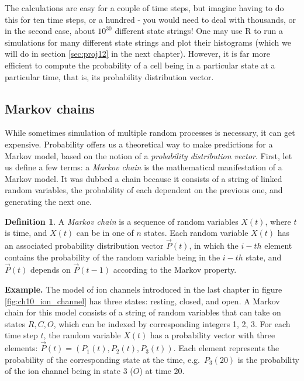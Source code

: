 \documentclass[
]{book}
\theoremstyle{definition}
\newtheorem{definition}{Definition}[chapter]
\theoremstyle{definition}
\theoremstyle{definition}
\theoremstyle{remark}
\begin{document}
The calculations are easy for a couple of time steps, but imagine having to do this for ten time steps, or a hundred - you would need to deal with thousands, or in the second case, about \(10^{30}\) different state strings! One may use R to run a simulations for many different state strings and plot their histograms (which we will do in section \ref{sec:proj12} in the next chapter). However, it is far more efficient to compute the probability of a cell being in a particular state at a particular time, that is, its probability distribution vector.

\hypertarget{markov-chains}{%
\subsection{Markov chains}\label{markov-chains}}

While sometimes simulation of multiple random processes is necessary, it can get expensive. Probability offers us a theoretical way to make predictions for a Markov model, based on the notion of a \emph{probability distribution vector}. First, let us define a few terms: a \emph{Markov chain} is the mathematical manifestation of a Markov model. It was dubbed a chain because it consists of a string of linked random variables, the probability of each dependent on the previous one, and generating the next one.

\begin{definition}
\protect\hypertarget{def:def-mark-chain}{}{\label{def:def-mark-chain} }A \emph{Markov chain} is a sequence of random variables \(X(t)\), where \(t\) is time, and \(X(t)\) can be in one of \(n\) states. Each random variable \(X(t)\) has an associated probability distribution vector \(\vec P(t)\), in which the \(i-th\) element contains the probability of the random variable being in the \(i-th\) state, and \(\vec P(t)\) depends on \(\vec P(t-1)\) according to the Markov property.
\end{definition}

\textbf{Example.} The model of ion channels introduced in the last chapter in figure \ref{fig:ch10_ion_channel} has three states: resting, closed, and open. A Markov chain for this model consists of a string of random variables that can take on states \(R, C, O\), which can be indexed by corresponding integers 1, 2, 3. For each time step \(t\), the random variable \(X(t)\) has a probability vector with three elements: \(\vec P(t) = (P_1(t), P_2(t), P_3(t))\). Each element represents the probability of the corresponding state at the time, e.g.~\(P_3(20)\) is the probability of the ion channel being in state 3 (\(O\)) at time 20.
\end{document}
